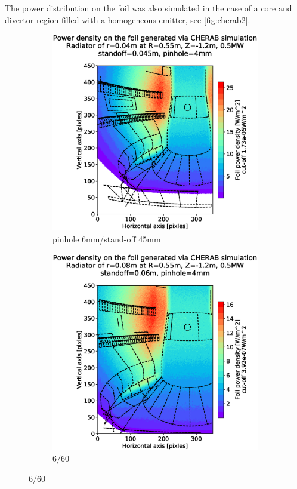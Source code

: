 
The power distribution on the foil was also simulated in the case of a core and divertor region filled with a homogeneous emitter, see \autoref{fig:cherab2}.
\begin{figure}[!ht]
     \centering
     \begin{subfigure}{0.48\linewidth}
         \centering
         \includegraphics[trim={85 25 50 80},clip,width=\textwidth]{Chapters/chapter2/figs/measured_power_4_45radiator_all_core_and_divertor.stl.eps}
         \caption{pinhole 6mm/stand-off 45mm}
         \label{fig:4_45_all}
     \end{subfigure}
     \hfill
     \begin{subfigure}{0.48\linewidth}
         \centering
         \includegraphics[trim={85 25 50 80},clip,width=\textwidth]{Chapters/chapter2/figs/measured_power_4_60radiator_all_core_and_divertor.stl.eps}
         \caption{$6/60$}
         \label{fig:4_60_all}
     \end{subfigure}


\end{figure}
